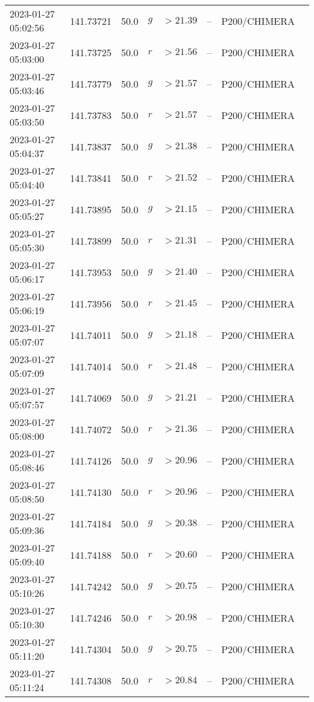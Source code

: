 \documentclass{nature_plusfigure}
\begin{document}
\begin{supplement}
\begin{center}
\begin{longtable}{llllllll}
2023-01-27 05:02:56 & 141.73721 & 50.0 & $g$ & $>21.39$ & -- & P200/CHIMERA &  \\ 
2023-01-27 05:03:00 & 141.73725 & 50.0 & $r$ & $>21.56$ & -- & P200/CHIMERA &  \\ 
2023-01-27 05:03:46 & 141.73779 & 50.0 & $g$ & $>21.57$ & -- & P200/CHIMERA &  \\ 
2023-01-27 05:03:50 & 141.73783 & 50.0 & $r$ & $>21.57$ & -- & P200/CHIMERA &  \\ 
2023-01-27 05:04:37 & 141.73837 & 50.0 & $g$ & $>21.38$ & -- & P200/CHIMERA &  \\ 
2023-01-27 05:04:40 & 141.73841 & 50.0 & $r$ & $>21.52$ & -- & P200/CHIMERA &  \\ 
2023-01-27 05:05:27 & 141.73895 & 50.0 & $g$ & $>21.15$ & -- & P200/CHIMERA &  \\ 
2023-01-27 05:05:30 & 141.73899 & 50.0 & $r$ & $>21.31$ & -- & P200/CHIMERA &  \\ 
2023-01-27 05:06:17 & 141.73953 & 50.0 & $g$ & $>21.40$ & -- & P200/CHIMERA &  \\ 
2023-01-27 05:06:19 & 141.73956 & 50.0 & $r$ & $>21.45$ & -- & P200/CHIMERA &  \\ 
2023-01-27 05:07:07 & 141.74011 & 50.0 & $g$ & $>21.18$ & -- & P200/CHIMERA &  \\ 
2023-01-27 05:07:09 & 141.74014 & 50.0 & $r$ & $>21.48$ & -- & P200/CHIMERA &  \\ 
2023-01-27 05:07:57 & 141.74069 & 50.0 & $g$ & $>21.21$ & -- & P200/CHIMERA &  \\ 
2023-01-27 05:08:00 & 141.74072 & 50.0 & $r$ & $>21.36$ & -- & P200/CHIMERA &  \\ 
2023-01-27 05:08:46 & 141.74126 & 50.0 & $g$ & $>20.96$ & -- & P200/CHIMERA &  \\ 
2023-01-27 05:08:50 & 141.74130 & 50.0 & $r$ & $>20.96$ & -- & P200/CHIMERA &  \\ 
2023-01-27 05:09:36 & 141.74184 & 50.0 & $g$ & $>20.38$ & -- & P200/CHIMERA &  \\ 
2023-01-27 05:09:40 & 141.74188 & 50.0 & $r$ & $>20.60$ & -- & P200/CHIMERA &  \\ 
2023-01-27 05:10:26 & 141.74242 & 50.0 & $g$ & $>20.75$ & -- & P200/CHIMERA &  \\ 
2023-01-27 05:10:30 & 141.74246 & 50.0 & $r$ & $>20.98$ & -- & P200/CHIMERA &  \\ 
2023-01-27 05:11:20 & 141.74304 & 50.0 & $g$ & $>20.75$ & -- & P200/CHIMERA &  \\ 
2023-01-27 05:11:24 & 141.74308 & 50.0 & $r$ & $>20.84$ & -- & P200/CHIMERA &  \\ 

\end{longtable}
\end{center}
\end{supplement}
\end{document}
